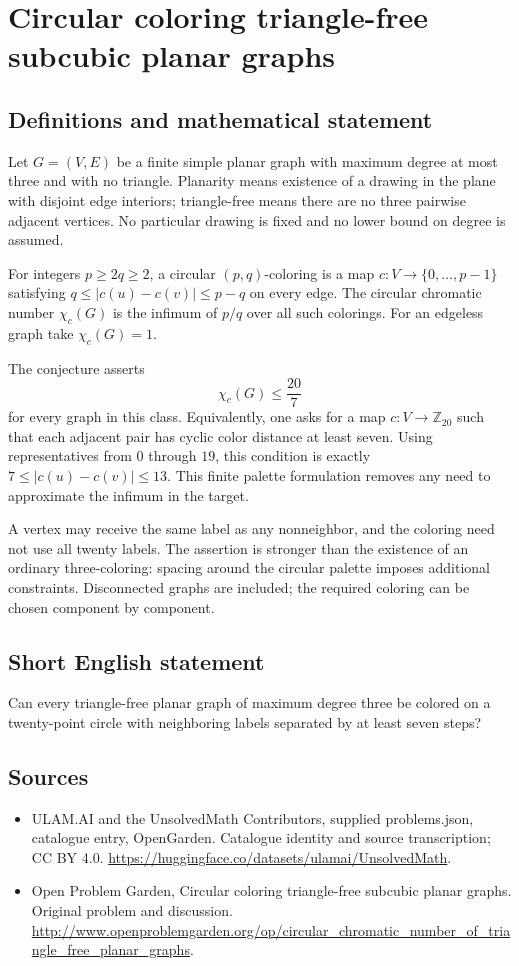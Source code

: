 \documentclass[11pt,a4paper]{article}
\begin{document}
\section*{Circular coloring triangle-free subcubic planar graphs}\label{statement}

\subsection{Definitions and mathematical statement}
Let $G=(V,E)$ be a finite simple planar graph with maximum degree at most three and with no triangle. Planarity means existence of a drawing in the plane with disjoint edge interiors; triangle-free means there are no three pairwise adjacent vertices. No particular drawing is fixed and no lower bound on degree is assumed.

For integers $p\ge2q\ge2$, a circular $(p,q)$-coloring is a map $c:V\to\{0,\ldots,p-1\}$ satisfying $q\le|c(u)-c(v)|\le p-q$ on every edge. The circular chromatic number $\chi_c(G)$ is the infimum of $p/q$ over all such colorings. For an edgeless graph take $\chi_c(G)=1$.

The conjecture asserts
\[
                        \chi_c(G)\le\frac{20}{7}
\]
for every graph in this class. Equivalently, one asks for a map $c:V\to\mathbb Z_{20}$ such that each adjacent pair has cyclic color distance at least seven. Using representatives from $0$ through $19$, this condition is exactly $7\le|c(u)-c(v)|\le13$. This finite palette formulation removes any need to approximate the infimum in the target.

A vertex may receive the same label as any nonneighbor, and the coloring need not use all twenty labels. The assertion is stronger than the existence of an ordinary three-coloring: spacing around the circular palette imposes additional constraints. Disconnected graphs are included; the required coloring can be chosen component by component.
\subsection{Short English statement}
Can every triangle-free planar graph of maximum degree three be colored on a twenty-point circle with neighboring labels separated by at least seven steps?
\subsection{Sources}
\begin{itemize}
\item[S1] ULAM.AI and the UnsolvedMath Contributors, supplied problems.json, catalogue entry, OpenGarden. Catalogue identity and source transcription; CC BY 4.0.
\url{https://huggingface.co/datasets/ulamai/UnsolvedMath}.
\item[S2] Open Problem Garden, Circular coloring triangle-free subcubic planar graphs. Original problem and discussion.
\url{http://www.openproblemgarden.org/op/circular_chromatic_number_of_triangle_free_planar_graphs}.
\end{itemize}
\end{document}
